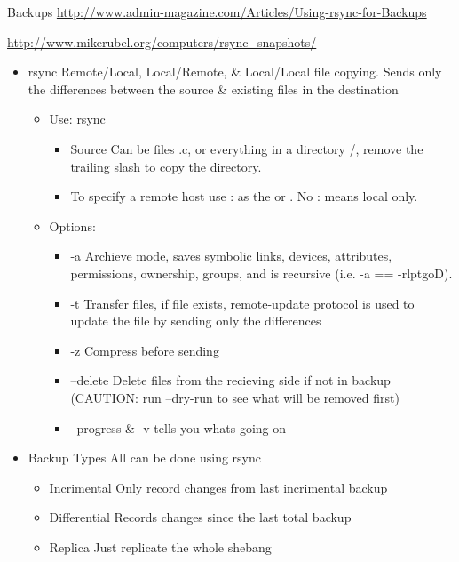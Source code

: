 \documentclass{notes}
\begin{document}
\begin{questions}{Backups}
	 \url{http://www.admin-magazine.com/Articles/Using-rsync-for-Backups}

	 \url{http://www.mikerubel.org/computers/rsync_snapshots/}

	\begin{itemize}
		\item rsync \ra Remote/Local, Local/Remote, \& Local/Local file copying. Sends only the differences between the source \& existing files in the destination
			\begin{itemize}
				\item Use: rsync   
					\begin{itemize}
						\item Source \ra Can be files \ra *.c, or everything in a directory /, remove the trailing slash to copy the directory.
						\item To specify a remote host \opt{computer name} use \ra {}: as the  or . No : means local only.
					\end{itemize}
				\item Options:
					\begin{itemize}
						\item -a \ra Archieve mode, saves symbolic links, devices, attributes, permissions, ownership, groups, and is recursive (i.e. -a == -rlptgoD).
						\item -t \ra Transfer files, if file exists, remote-update protocol is used to update the file by sending only the differences
						\item -z \ra Compress before sending
						\item --delete \ra Delete files from the recieving side if not in backup (CAUTION: run --dry-run to see what will be removed first)
						\item --progress \& -v tells you whats going on
					\end{itemize}
			\end{itemize}
		\item Backup Types \ra All can be done using rsync
			\begin{itemize}
				\item Incrimental \ra Only record changes from last incrimental backup
				\item Differential \ra Records changes since the last total backup
				\item Replica \ra Just replicate the whole shebang

\end{itemize}
\end{itemize}
\end{questions}
\end{document}

